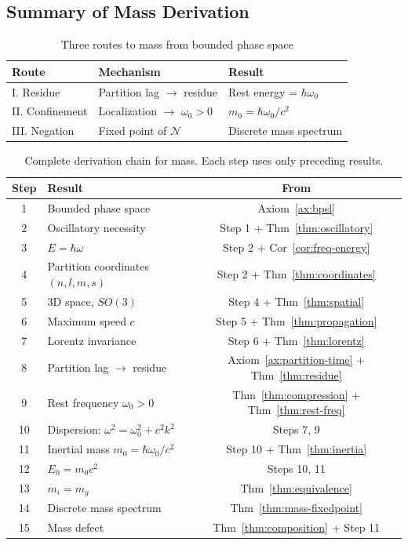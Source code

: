 \documentclass[twocolumn,10pt,a4paper]{article}
\theoremstyle{definition}
\theoremstyle{remark}
\begin{document}
\subsection{Summary of Mass Derivation}

\begin{table}[H]
\centering
\caption{Three routes to mass from bounded phase space}
\label{tab:mass-routes}
\small
\begin{tabular}{lll}
\toprule
\textbf{Route} & \textbf{Mechanism} & \textbf{Result} \\
\midrule
I. Residue & Partition lag $\to$ residue & Rest energy = $\hbar\omega_0$ \\
II. Confinement & Localization $\to$ $\omega_0 > 0$ & $m_0 = \hbar\omega_0/c^2$ \\
III. Negation & Fixed point of $\mathcal{N}$ & Discrete mass spectrum \\
\bottomrule
\end{tabular}
\end{table}

\begin{table}[H]
\centering
\caption{Complete derivation chain for mass. Each step uses only preceding results.}
\label{tab:chain}
\small
\begin{tabular}{clc}
\toprule
\textbf{Step} & \textbf{Result} & \textbf{From} \\
\midrule
1 & Bounded phase space & Axiom~\ref{ax:bpsl} \\
2 & Oscillatory necessity & Step 1 + Thm~\ref{thm:oscillatory} \\
3 & $E = \hbar\omega$ & Step 2 + Cor~\ref{cor:freq-energy} \\
4 & Partition coordinates $(n,l,m,s)$ & Step 2 + Thm~\ref{thm:coordinates} \\
5 & 3D space, $SO(3)$ & Step 4 + Thm~\ref{thm:spatial} \\
6 & Maximum speed $c$ & Step 5 + Thm~\ref{thm:propagation} \\
7 & Lorentz invariance & Step 6 + Thm~\ref{thm:lorentz} \\
8 & Partition lag $\to$ residue & Axiom~\ref{ax:partition-time} + Thm~\ref{thm:residue} \\
9 & Rest frequency $\omega_0 > 0$ & Thm~\ref{thm:compression} + Thm~\ref{thm:rest-freq} \\
10 & Dispersion: $\omega^2 = \omega_0^2 + c^2k^2$ & Steps 7, 9 \\
11 & Inertial mass $m_0 = \hbar\omega_0/c^2$ & Step 10 + Thm~\ref{thm:inertia} \\
12 & $E_0 = m_0c^2$ & Steps 10, 11 \\
13 & $m_i = m_g$ & Thm~\ref{thm:equivalence} \\
14 & Discrete mass spectrum & Thm~\ref{thm:mass-fixedpoint} \\
15 & Mass defect & Thm~\ref{thm:composition} + Step 11 \\
\bottomrule
\end{tabular}
\end{table}
\end{document}
